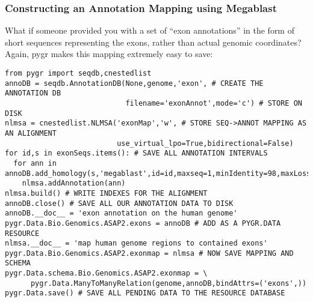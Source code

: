 \documentclass{howto}
\begin{document}
\subsubsection{Constructing an Annotation Mapping using Megablast}
What if someone provided you with a set of ``exon annotations'' in the form
of short sequences representing the exons, rather than actual genomic
coordinates?  Again, pygr makes this mapping extremely easy to save:
\begin{verbatim}
from pygr import seqdb,cnestedlist
annoDB = seqdb.AnnotationDB(None,genome,'exon', # CREATE THE ANNOTATION DB
                            filename='exonAnnot',mode='c') # STORE ON DISK
nlmsa = cnestedlist.NLMSA('exonMap','w', # STORE SEQ->ANNOT MAPPING AS AN ALIGNMENT
                          use_virtual_lpo=True,bidirectional=False)
for id,s in exonSeqs.items(): # SAVE ALL ANNOTATION INTERVALS
  for ann in annoDB.add_homology(s,'megablast',id=id,maxseq=1,minIdentity=98,maxLoss=2):
    nlmsa.addAnnotation(ann)
nlmsa.build() # WRITE INDEXES FOR THE ALIGNMENT
annoDB.close() # SAVE ALL OUR ANNOTATION DATA TO DISK
annoDB.__doc__ = 'exon annotation on the human genome'
pygr.Data.Bio.Genomics.ASAP2.exons = annoDB # ADD AS A PYGR.DATA RESOURCE
nlmsa.__doc__ = 'map human genome regions to contained exons'
pygr.Data.Bio.Genomics.ASAP2.exonmap = nlmsa # NOW SAVE MAPPING AND SCHEMA
pygr.Data.schema.Bio.Genomics.ASAP2.exonmap = \
      pygr.Data.ManyToManyRelation(genome,annoDB,bindAttrs=('exons',))
pygr.Data.save() # SAVE ALL PENDING DATA TO THE RESOURCE DATABASE
\end{verbatim}
\end{document}
